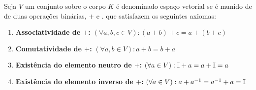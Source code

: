 \documentclass[../../main]{subfiles}
\begin{document}
    \begin{defi}\label{defi:espaco-vetorial}
        Seja $V$ um conjunto sobre o corpo $K$ é denominado espaço vetorial se é munido de de duas operações binárias, $+$ e $.$ que satisfazem os seguintes axiomas:

        \begin{enumerate}
            \item \textbf{Associatividade de $+$:} $(\forall a,b,c \in V): (a+b)+c=a+(b+c)$

            \item \textbf{Comutatividade de $+$:} $(\forall a,b \in V): a+b=b+a$

            \item \textbf{Existência do elemento neutro de $+$:} $(\forall a \in V): \mathbb{I}+a=a+\mathbb{I}=a$

            \item \textbf{Existência do elemento inverso de $+$:} $(\forall a \in V): a+a^{-1}=a^{-1}+a=\mathbb{I}$


        \end{enumerate}
    \end{defi}
\end{document}
